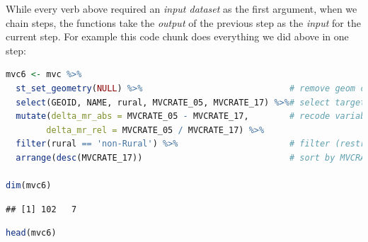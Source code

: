 \documentclass[
]{book}
\begin{document}
While every verb above required an \emph{input dataset} as the first argument, when we chain steps, the functions take the \emph{output} of the previous step as the \emph{input} for the current step. For example this code chunk does everything we did above in one step:

\begin{lstlisting}[language=R]
mvc6 <- mvc %>%
  st_set_geometry(NULL) %>%                             # remove geom column
  select(GEOID, NAME, rural, MVCRATE_05, MVCRATE_17) %>%# select target variables
  mutate(delta_mr_abs = MVCRATE_05 - MVCRATE_17,        # recode variables
        delta_mr_rel = MVCRATE_05 / MVCRATE_17) %>%
  filter(rural == 'non-Rural') %>%                      # filter (restrict) rows
  arrange(desc(MVCRATE_17))                             # sort by MVCRATE_17

dim(mvc6)
\end{lstlisting}

\begin{lstlisting}
## [1] 102   7
\end{lstlisting}

\begin{lstlisting}[language=R]
head(mvc6)
\end{lstlisting}

 
  \providecommand{\huxb}[2]{\arrayrulecolor[RGB]{#1}\global\arrayrulewidth=#2pt}
  \providecommand{\huxvb}[2]{\color[RGB]{#1}\vrule width #2pt}
  \providecommand{\huxtpad}[1]{\rule{0pt}{#1}}
  \providecommand{\huxbpad}[1]{\rule[-#1]{0pt}{#1}}
\end{document}
